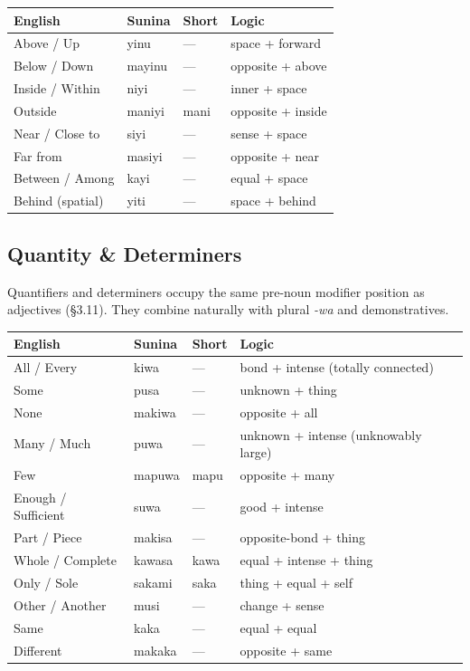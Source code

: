 \documentclass[12pt, a4paper]{article}
\begin{document}
\begin{tabular}{@{}llll@{}}
\toprule
\textbf{English} & \textbf{Sunina} & \textbf{Short} & \textbf{Logic} \\ \midrule
Above / Up & yinu & --- & space + forward \\
Below / Down & mayinu & --- & opposite + above \\
Inside / Within & niyi & --- & inner + space \\
Outside & maniyi & mani & opposite + inside \\
Near / Close to & siyi & --- & sense + space \\
Far from & masiyi & --- & opposite + near \\
Between / Among & kayi & --- & equal + space \\
Behind (spatial) & yiti & --- & space + behind \\
\bottomrule
\end{tabular}

\subsection{Quantity \& Determiners}
Quantifiers and determiners occupy the same pre-noun modifier position as adjectives (\S3.11). They combine naturally with plural \textit{-wa} and demonstratives.

\begin{tabular}{@{}llll@{}}
\toprule
\textbf{English} & \textbf{Sunina} & \textbf{Short} & \textbf{Logic} \\ \midrule
All / Every & kiwa & --- & bond + intense (totally connected) \\
Some & pusa & --- & unknown + thing \\
None & makiwa & --- & opposite + all \\
Many / Much & puwa & --- & unknown + intense (unknowably large) \\
Few & mapuwa & mapu & opposite + many \\
Enough / Sufficient & suwa & --- & good + intense \\
Part / Piece & makisa & --- & opposite-bond + thing \\
Whole / Complete & kawasa & kawa & equal + intense + thing \\
Only / Sole & sakami & saka & thing + equal + self \\
Other / Another & musi & --- & change + sense \\
Same & kaka & --- & equal + equal \\
Different & makaka & --- & opposite + same \\
\bottomrule
\end{tabular}
\end{document}
